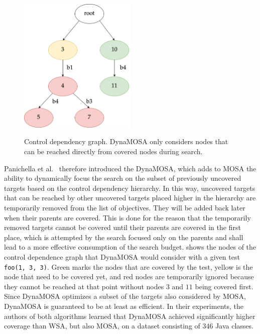 \documentclass[paper=a4,%
  twoside,%
  BCOR4mm,%
  abstract=true,%
  toc=bibliography,%
  chapterprefix=true,%
  toc=bibliographynumbered,%
  open=right,%
  english,%
  pagesize=pdftex]{scrreprt}
\begin{document}
\begin{figure}[h]
\caption{Control dependency graph. DynaMOSA only considers nodes that can be reached directly from covered nodes during search.}
\centering
\includegraphics[width=0.5\textwidth]{cdg-code-example}
\label{fig:example-control-dependencies}
\end{figure}

Panichella et al.~\cite{Panichella2018} therefore introduced the \ac{DynaMOSA}, which adds to \ac{MOSA} the ability to dynamically focus the search on the subset of previously uncovered targets based on the control dependency hierarchy. In this way, uncovered targets that can be reached by other uncovered targets placed higher in the hierarchy are temporarily removed from the list of objectives. They will be added back later when their parents are covered. This is done for the reason that the temporarily removed targets cannot be covered until their parents are covered in the first place, which is attempted by the search focused only on the parents and shall lead to a more effective consumption of the search budget.  shows the nodes of the control dependence graph that \ac{DynaMOSA} would consider with a given test \lstinline{foo(1, 3, 3)}. Green marks the nodes that are covered by the test, yellow is the node that need to be covered yet, and red nodes are temporarily ignored because they cannot be reached at that point without nodes $3$ and $11$ being covered first. Since \ac{DynaMOSA} optimizes a subset of the targets also considered by \ac{MOSA}, \ac{DynaMOSA} is guaranteed to be at least as efficient. In their experiments, the authors of both algorithms learned that \ac{DynaMOSA} achieved significantly higher coverage than \ac{WSA}, but also \ac{MOSA}, on a dataset consisting of 346 Java classes.
\end{document}
